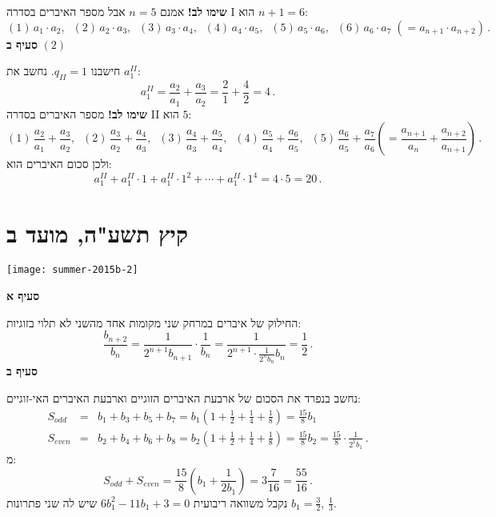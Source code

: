 \np

\textbf{שימו לב!}
אמנם
$n=5$
אבל מספר האיברים בסדרה I הוא 
$n+1=6$:
\[
(1)\, a_1\cdot a_2,\;\; (2)\,a_2\cdot a_3,\;\;(3)\, a_3\cdot a_4,\;\; (4)\,a_4\cdot a_5,\;\; (5)\,a_5\cdot a_6,\;\; (6)\,a_6\cdot a_7 \;(= a_{n+1}\cdot a_{n+2})\,.
\]
\textbf{סעיף ב}
$(2)$

חישבנו
$q_{II}=1$.
נחשב את
$a_1^{II}$:
\[
a_1^{II}=\frac{a_{2}}{a_1} + \frac{a_{3}}{a_{2}}=\frac{2}{1}+\frac{4}{2}=4\,.
\]
\textbf{שימו לב!}
מספר האיברים בסדרה II הוא 
$5$:
\[
(1)\,\frac{a_2}{a_1}+\frac{a_3}{a_2},\;\;
(2)\,\frac{a_3}{a_2}+\frac{a_4}{a_3},\;\;
(3)\,\frac{a_4}{a_3}+\frac{a_5}{a_4},\;\;
(4)\,\frac{a_5}{a_4}+\frac{a_6}{a_5},\;\;
(5)\,\frac{a_6}{a_5}+\frac{a_7}{a_6} \left(= \frac{a_{n+1}}{a_n}+\frac{a_{n+2}}{a_{n+1}}\right)\,.
\]
ולכן סכום האיברים הוא:
\[
a_1^{II}+a_1^{II}\cdot 1 + a_1^{II}\cdot 1^2 + \cdots + a_1^{II}\cdot 1^4 = 4\cdot 5=20\,.
\]


\np

\section{קיץ תשע"ה, מועד ב}

\begin{center}
\texttt{[image: summer-2015b-2]}
\end{center}
\vspace{-2ex}

\textbf{סעיף א}

החילוק של איברים במרחק שני מקומות אחד מהשני לא תלוי בזוגיות:
\[
\frac{b_{n+2}}{b_n} = \frac{1}{2^{n+1}b_{n+1}}\cdot\frac{1}{b_n}=\frac{1}{2^{n+1}\cdot\displaystyle\frac{1}{2^nb_n}{b_n}}= \frac{1}{2}\,.
\]
\textbf{סעיף ב}

 נחשב בנפרד את הסכום של ארבעת האיברים הזוגיים וארבעת האיברים האי-זוגיים:
\begin{eqnarray*}
S_{\mathit{odd}} &=& b_1+b_3+b_5+b_7=b_1\left(1 + \frac{1}{2} + \frac{1}{4} +\frac{1}{8}\right)=\frac{15}{8}b_1\\
S_{\mathit{even}} &=& b_2+b_4+b_6+b_8=b_2\left(1 + \frac{1}{2} + \frac{1}{4} +\frac{1}{8}\right)=\frac{15}{8}b_2=\frac{15}{8}\cdot\frac{1}{2^1b_1}\,.
\end{eqnarray*}
מ:
\[
S_{\mathit{odd}} + S_{\mathit{even}} =\frac{15}{8}\left(b_1+\frac{1}{2b_1}\right)= 3\frac{7}{16}=\frac{55}{16}\,.
\]
נקבל משוואה ריבועית 
$6b_1^2-11b_1+3=0$
שיש לה שני פתרונות 
$b_1=\frac{3}{2},\,\frac{1}{3}$.


